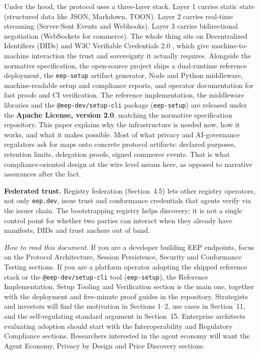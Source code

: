 \documentclass[12pt,a4paper]{article}
\begin{document}
Under the hood, the protocol uses a three-layer stack. Layer 1 carries static state (structured data like JSON, Markdown, TOON). Layer 2 carries real-time streaming (Server-Sent Events and Webhooks). Layer 3 carries bidirectional negotiation (WebSockets for commerce). The whole thing sits on Decentralized Identifiers (DIDs) \cite{ref5} and W3C Verifiable Credentials 2.0 \cite{ref10}, which give machine-to-machine interaction the trust and sovereignty it actually requires. Alongside the normative specification, the open-source project ships a dual-runtime reference deployment, the \texttt{eep-setup} artifact generator, Node and Python middleware, machine-readable setup and compliance reports, and operator documentation for fast proofs and CI verification. The reference implementation, the middleware libraries and the \texttt{@eep-dev/setup-cli} package (\texttt{eep-setup}) are released under the \textbf{Apache License, version 2.0}, matching the normative specification repository. This paper explains why the infrastructure is needed now, how it works, and what it makes possible. Most of what privacy and AI-governance regulators ask for maps onto concrete protocol artifacts: declared purposes, retention limits, delegation proofs, signed commerce events. That is what compliance-oriented design at the wire level means here, as opposed to narrative assurances after the fact.

\textbf{Federated trust.} Registry federation (Section~4.5) lets other registry operators, not only \texttt{eep.dev}, issue trust and conformance credentials that agents verify via the issuer chain. The bootstrapping registry helps discovery; it is not a single control point for whether two parties can interact when they already have manifests, DIDs and trust anchors out of band.


\noindent\textit{How to read this document.} If you are a developer building EEP endpoints, focus on the Protocol Architecture, Session Persistence, Security and Conformance Testing sections. If you are a platform operator adopting the shipped reference stack or the \texttt{@eep-dev/setup-cli} tool (\texttt{eep-setup}), the Reference Implementation, Setup Tooling and Verification section is the main one, together with the deployment and five-minute proof guides in the repository. Strategists and investors will find the motivation in Sections 1--2, use cases in Section~11, and the self-regulating standard argument in Section~15. Enterprise architects evaluating adoption should start with the Interoperability and Regulatory Compliance sections. Researchers interested in the agent economy will want the Agent Economy, Privacy by Design and Price Discovery sections.
\end{document}
